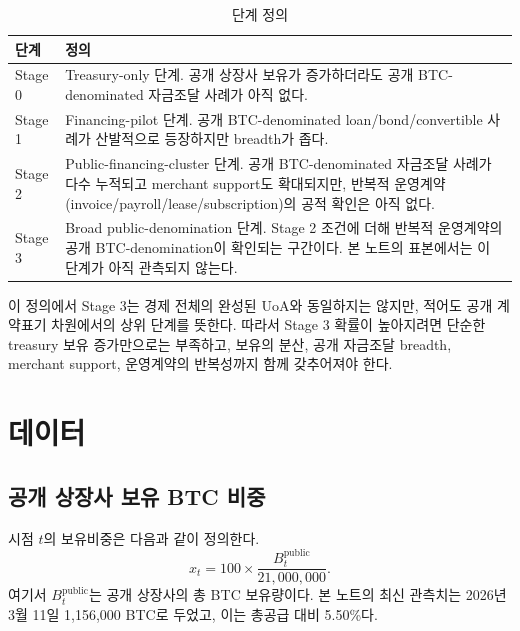 \documentclass[11pt,a4paper]{article}
\begin{document}
\begin{table}[H]
\centering
\caption{단계 정의}
\label{tab:stagedef}
\begin{tabularx}{\textwidth}{@{}lY@{}}
\toprule
단계 & 정의 \\
\midrule
Stage 0 & Treasury-only 단계. 공개 상장사 보유가 증가하더라도 공개 BTC-denominated 자금조달 사례가 아직 없다. \\
Stage 1 & Financing-pilot 단계. 공개 BTC-denominated loan/bond/convertible 사례가 산발적으로 등장하지만 breadth가 좁다. \\
Stage 2 & Public-financing-cluster 단계. 공개 BTC-denominated 자금조달 사례가 다수 누적되고 merchant support도 확대되지만, 반복적 운영계약(invoice/payroll/lease/subscription)의 공적 확인은 아직 없다. \\
Stage 3 & Broad public-denomination 단계. Stage 2 조건에 더해 반복적 운영계약의 공개 BTC-denomination이 확인되는 구간이다. 본 노트의 표본에서는 이 단계가 아직 관측되지 않는다. \\
\bottomrule
\end{tabularx}
\end{table}

이 정의에서 Stage 3는 경제 전체의 완성된 UoA와 동일하지는 않지만, 적어도 공개 계약표기 차원에서의 상위 단계를 뜻한다. 따라서 Stage 3 확률이 높아지려면 단순한 treasury 보유 증가만으로는 부족하고, 보유의 분산, 공개 자금조달 breadth, merchant support, 운영계약의 반복성까지 함께 갖추어져야 한다.

\section{데이터}

\subsection{공개 상장사 보유 BTC 비중}

시점 $t$의 보유비중은 다음과 같이 정의한다.
\begin{equation}
 x_t = 100 \times \frac{B_t^{\mathrm{public}}}{21{,}000{,}000}.
\end{equation}
여기서 $B_t^{\mathrm{public}}$는 공개 상장사의 총 BTC 보유량이다. 본 노트의 최신 관측치는 2026년 3월 11일 1,156,000 BTC로 두었고, 이는 총공급 대비 5.50\%다.
\end{document}
